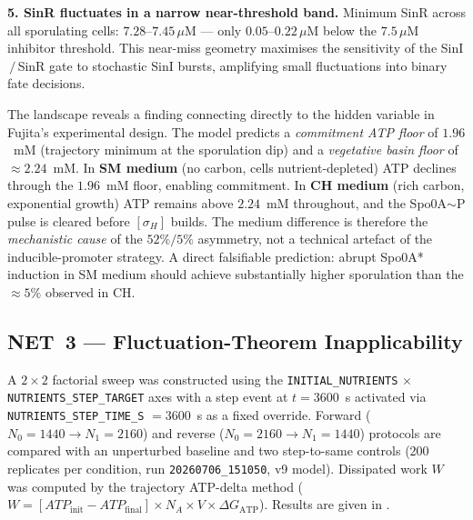 \documentclass[11pt,a4paper]{article}
\begin{document}
\textbf{5. SinR fluctuates in a narrow near-threshold band.}
Minimum SinR across all sporulating cells: $7.28$--$7.45\,\mu$M ---
only $0.05$--$0.22\,\mu$M below the $7.5\,\mu$M inhibitor threshold.
This near-miss geometry maximises the sensitivity of the SinI$\,/\,$SinR
gate to stochastic SinI bursts, amplifying small fluctuations into
binary fate decisions.

The landscape reveals a finding connecting directly to the hidden
variable in Fujita's experimental design.
The model predicts a \emph{commitment ATP floor} of $1.96$~mM
(trajectory minimum at the sporulation dip) and a
\emph{vegetative basin floor} of $\approx 2.24$~mM.
In \textbf{SM medium} (no carbon, cells nutrient-depleted) ATP declines
through the $1.96$~mM floor, enabling commitment.
In \textbf{CH medium} (rich carbon, exponential growth) ATP remains
above $2.24$~mM throughout, and the Spo0A$\sim$P pulse is cleared
before $[\sigma_H]$ builds.
The medium difference is therefore the \emph{mechanistic cause} of the
$52\%/5\%$ asymmetry, not a technical artefact of the inducible-promoter
strategy.  A direct falsifiable prediction: abrupt Spo0A* induction in
SM medium should achieve substantially higher sporulation than the
$\approx 5\%$ observed in CH.

\subsection{NET~3 --- Fluctuation-Theorem Inapplicability}
\label{ssec:t3}

A $2\times2$ factorial sweep was constructed using the
\texttt{INITIAL\_NUTRIENTS} $\times$ \texttt{NUTRIENTS\_STEP\_TARGET} axes
with a step event at $t = 3600$~s activated via \texttt{NUTRIENTS\_STEP\_TIME\_S}
$= 3600$~s as a fixed override.
Forward (\(N_0{=}1440 \to N_1{=}2160\)) and
reverse (\(N_0{=}2160 \to N_1{=}1440\)) protocols are compared with an
unperturbed baseline and two step-to-same controls (200 replicates per condition,
run \texttt{20260706\_151050}, v9 model).
Dissipated work $W$ was computed by the trajectory ATP-delta method
($W = [ATP_{\mathrm{init}} - ATP_{\mathrm{final}}] \times N_A \times V \times \Delta G_{\mathrm{ATP}}$).
Results are given in .
\end{document}

